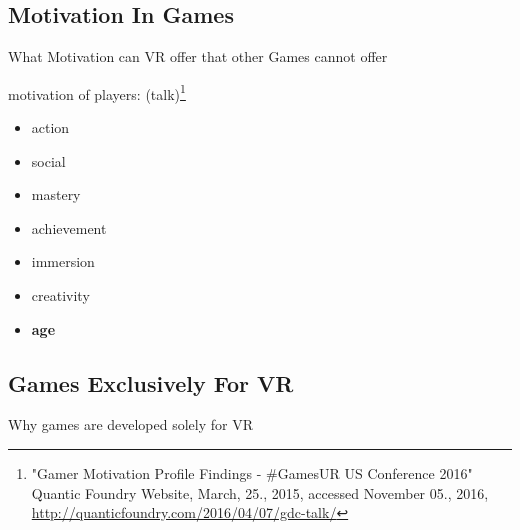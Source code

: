 \subsection{Motivation In Games}
What Motivation can VR offer that other Games cannot offer

motivation of players: (talk)\footnote{"Gamer Motivation Profile Findings - \#GamesUR US Conference 2016" Quantic Foundry Website, March, 25., 2015, accessed November 05., 2016, \url{http://quanticfoundry.com/2016/04/07/gdc-talk/}}
\begin{itemize}
	\item action
	\item social
	\item mastery
	\item achievement
	\item immersion
	\item creativity
	\item \textbf{age}
\end{itemize}

\subsection{Games Exclusively For VR}
Why games are developed solely for VR
